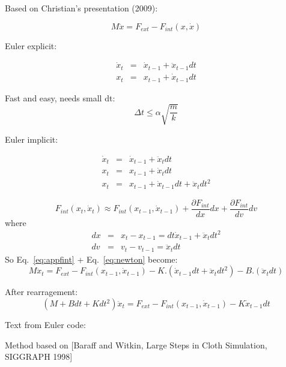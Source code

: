 \documentclass[9pt]{article}
\begin{document}
{\Large Based on Christian's presentation (2009)}:

\begin{equation}
M \ddot{x} = F_{ext} - F_{int}(x,\dot{x})
\label{eq:newton}
\end{equation}

Euler explicit:

\begin{eqnarray}
\dot{x}_t & = & \dot{x}_{t-1} + \ddot{x}_{t-1} dt \\
x_t & = & x_{t-1} + \dot{x}_{t-1} dt
\end{eqnarray}

Fast and easy, needs small dt:   
\begin{equation}
\Delta t \leq \alpha\sqrt{\frac{m}{k}}
\end{equation}


Euler implicit: 

\begin{eqnarray}
\dot{x}_t & = & \dot{x}_{t-1} + \ddot{x}_t dt \\
x_t & = & x_{t-1} + \dot{x}_t dt \\
x_t & = & x_{t-1} + \dot{x}_{t-1}dt + \ddot{x}_t dt^2
\end{eqnarray}

\begin{equation}
F_{int}(x_{t}, \dot{x}_t) \approx F_{int}(x_{t-1}, \dot{x}_{t-1}) + \frac{\partial F_{int}}{dx}dx + \frac{\partial F_{int}}{dv} dv
\label{eq:appfint}
\end{equation}
where
\begin{eqnarray}
dx & = & x_t - x_{t-1} = dt\dot{x}_{t-1} + \ddot{x}_t dt^2 \\
dv & = & v_t - v_{t-1} = \ddot{x}_t dt
\end{eqnarray}
So Eq.~\ref{eq:appfint} + Eq.~\ref{eq:newton} become:
\begin{equation}
M\ddot{x}_t = F_{ext} - F_{int}(x_{t-1},\dot{x}_{t-1}) - K.(\dot{x}_{t-1}dt + \ddot{x}_t dt^2) - B.(\ddot{x}_t dt)
\end{equation}

After rearragement:
\begin{equation}
(M + Bdt + Kdt^2)\ddot{x}_t = F_{ext} -  F_{int} (x_{t-1},\dot{x}_{t-1}) -  K\dot{x}_{t-1}dt
\end{equation}


\newpage
{\Large Text from Euler code:}

 Method based on [Baraff and Witkin, Large Steps in Cloth Simulation, SIGGRAPH 1998]
\end{document}
